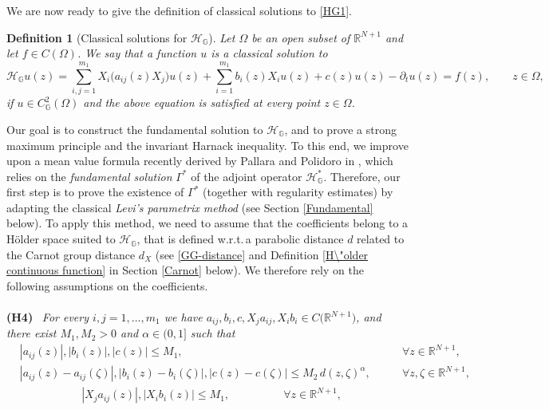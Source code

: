 \documentclass[11pt,a4paper]{article}
\newtheorem{definition}[theorem]{\bf Definition}
\numberwithin{equation}{section}
\newcommand{\R}{\mathbb{R}}
\def \rnn {{\mathbb {R}}^{N+1}}
\def \GG {{\mathbb{G}}}
\def \p {\partial}
\def \H {\mathscr{H}_\GG}
\def \HH{\mathscr{H}_\GG^*}
\def \a {{\alpha}}
\def \G {{\Gamma}}
\def \z {{\zeta}}
\def \O {{\Omega}}
\begin{document}
{We are now ready to give the definition of classical solutions to \eqref{HG1}. 
\begin{definition}[Classical solutions for $\H$]\label{Def-classical}
	Let $\Omega$ be an open subset of $\R^{N+1}$ and let $f\in C(\O)$. We say that a function $u$ is a classical solution to
	\begin{equation}
		\H u(z) =\sum_{i,j=1}^{m_1} X_i\big(a_{ij}(z)X_j\big)u(z) + \sum_{i=1}^{m_1} b_i(z)X_iu(z)+ c(z)u(z)-\p_t u(z)=f(z),\qquad z \in \O,
	\end{equation}
	if $u \in C^2_{\GG}(\O)$ and the above equation is satisfied at every point $z \in \O$.
\end{definition}
Our goal is to construct the fundamental solution to $\H$, and to prove a strong maximum principle and the invariant Harnack inequality. To this end, we improve upon a mean value formula recently derived by Pallara and Polidoro in \cite{pallara2023meanvalueformulasclassical}, which relies on the \emph{fundamental solution} $\G^*$ of the adjoint operator $\HH$.  Therefore, our first step is to prove the existence of $\G^*$ (together with regularity estimates) by adapting the classical \emph{Levi's parametrix method} (see Section \ref{Fundamental} below). To apply this method, we need to assume that the coefficients belong to a H\"older space suited to $\H$, that is defined w.r.t.$\,$a parabolic distance $d$  related to the Carnot group distance $d_X$ (see \eqref{GG-distance} and Definition \ref{H\"older continuous function} in Section \ref{Carnot} below). We therefore rely on the following assumptions on the coefficients. 
\\\\
\noindent
{{\bf(H4)}}\ {
\it For every $i,j=1,\ldots,m_1$ we have $a_{ij},b_i,c,X_ja_{ij},X_ib_i \in C\big(\rnn\big)$, and there exist $M_1,M_2>0$ and $\a\in(0,1]$ such that
\begin{equation}\label{non-divergence-form-condition}
	\begin{aligned}
		&|a_{ij}(z)|,|b_{i}(z)|,|c(z)|\leq M_1,\qquad &\forall z \in \rnn,\\
		&|a_{ij}(z)-a_{ij}(\z)|,|b_{i}(z)-b_i(\z)|,|c(z)-c(\z)|\leq M_2\,d(z,\z)^\a, \qquad &\forall z,\z\in \rnn,
	\end{aligned}
\end{equation}
\begin{equation}\label{divergence-form-condition}
	\begin{aligned}
		&\!\!\!\!\!\!\!\!\!\!\!\!|X_ja_{ij}(z)|,|X_ib_{i}(z)|\leq M_1,\qquad &\qquad\forall z \in \rnn,\\

\end{aligned}
\end{equation}}}
\end{document}
